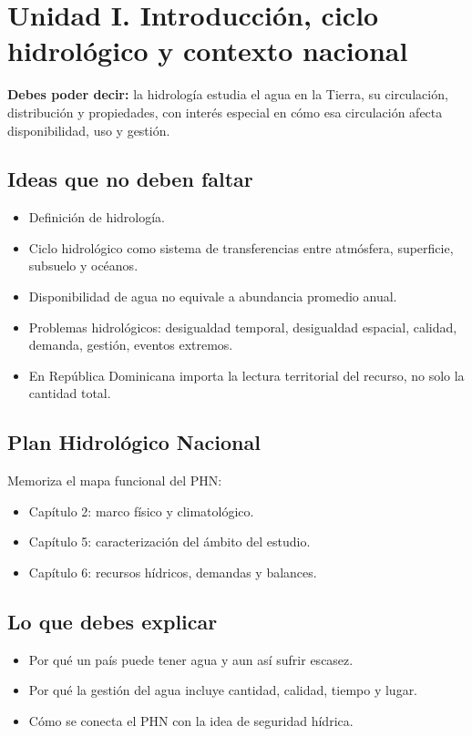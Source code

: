 \documentclass[11pt]{article}
\begin{document}
\section{Unidad I. Introducción, ciclo hidrológico y contexto nacional}
\begin{conceptbox}
\textbf{Debes poder decir:} la hidrología estudia el agua en la Tierra, su circulación, distribución y propiedades, con interés especial en cómo esa circulación afecta disponibilidad, uso y gestión.
\end{conceptbox}

\subsection{Ideas que no deben faltar}
\begin{itemize}
\item Definición de hidrología.
\item Ciclo hidrológico como sistema de transferencias entre atmósfera, superficie, subsuelo y océanos.
\item Disponibilidad de agua no equivale a abundancia promedio anual.
\item Problemas hidrológicos: desigualdad temporal, desigualdad espacial, calidad, demanda, gestión, eventos extremos.
\item En República Dominicana importa la lectura territorial del recurso, no solo la cantidad total.
\end{itemize}

\subsection{Plan Hidrológico Nacional}
\begin{resultbox}
Memoriza el mapa funcional del PHN:
\begin{itemize}
\item Capítulo 2: marco físico y climatológico.
\item Capítulo 5: caracterización del ámbito del estudio.
\item Capítulo 6: recursos hídricos, demandas y balances.
\end{itemize}
\end{resultbox}

\subsection{Lo que debes explicar}
\begin{itemize}
\item Por qué un país puede tener agua y aun así sufrir escasez.
\item Por qué la gestión del agua incluye cantidad, calidad, tiempo y lugar.
\item Cómo se conecta el PHN con la idea de seguridad hídrica.
\end{itemize}
\end{document}
